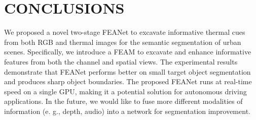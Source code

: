 \documentclass[letterpaper, 10 pt, conference]{ieeeconf}  \usepackage{graphicx}
\begin{document}
\section{CONCLUSIONS}
We proposed a novel two-stage FEANet to excavate informative thermal cues from both RGB and thermal images for the semantic segmentation of urban scenes. Specifically, we introduce a FEAM to excavate and enhance informative features from both the channel and spatial views. The experimental results demonstrate that FEANet performs better on small target object segmentation and produces sharp object boundaries. The proposed FEANet runs at real-time speed on a single GPU, making it a potential solution for autonomous driving applications. In the future, we would like to fuse more different modalities of information (e. g., depth, audio) into a network for segmentation improvement.

\addtolength{\textheight}{-12cm}   






\end{document}
